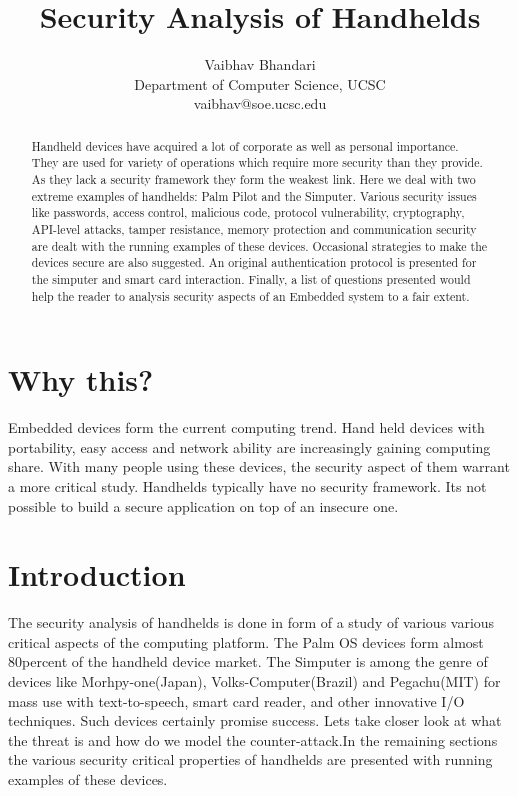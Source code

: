 \documentclass[11pt]{article}
\begin{document}
\title{Security Analysis of Handhelds}
\author{Vaibhav Bhandari\\
Department of Computer Science, UCSC\\
vaibhav@soe.ucsc.edu
}
\maketitle

\begin{abstract}
Handheld devices have acquired a lot of corporate as well as personal importance. They are used for variety of operations which require more security than they provide. As they lack a security framework they form the weakest link. Here we deal with two extreme examples of handhelds: Palm Pilot and the Simputer. Various security issues like passwords, access control, malicious code, protocol vulnerability, cryptography, API-level attacks, tamper resistance, memory protection and communication security are dealt with the running examples of these devices. Occasional strategies to make the devices secure are also suggested. An original authentication protocol is presented for the simputer and smart card interaction. Finally, a list of questions presented would help the reader to analysis security aspects of an Embedded system to a fair extent.
\end{abstract}

\section{Why this?}
Embedded devices form the current computing trend. Hand held devices with portability, easy access and network ability are increasingly gaining computing share. With many people using these devices, the security aspect of them warrant a more critical study. Handhelds typically have no security framework. Its not possible to build a secure application on top of an insecure one.

\section{Introduction}
The security analysis of handhelds is done in form of a study of various various critical aspects of the computing platform. The Palm OS devices form almost 80percent \cite{mudge01} of the handheld device market. The Simputer is among the genre of devices like Morhpy-one(Japan), Volks-Computer(Brazil) and Pegachu(MIT) for mass use with  text-to-speech, smart card reader, and other innovative I/O techniques. Such devices certainly promise success. Lets take closer look at what the threat is and how do we model the counter-attack.In the remaining sections the various security critical properties of handhelds are presented with running examples of these devices.
\end{document}
